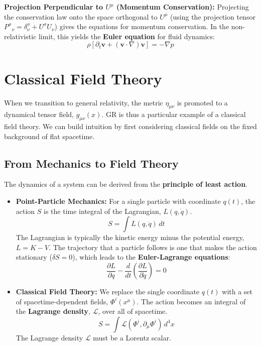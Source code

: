 \documentclass[11pt, a4paper]{report}
\begin{document}
\textbf{Projection Perpendicular to $U^\mu$ (Momentum Conservation):} Projecting the conservation law onto the space orthogonal to $U^\mu$ (using the projection tensor ${P^\sigma}_\nu = \delta^\sigma_\nu + U^\sigma U_\nu$) gives the equations for momentum conservation. In the non-relativistic limit, this yields the \textbf{Euler equation} for fluid dynamics:
\begin{equation}
    \rho[\partial_t \mathbf{v} + (\mathbf{v}\cdot\nabla)\mathbf{v}] = -\nabla p
\end{equation}
\section{Classical Field Theory}

When we transition to general relativity, the metric $\eta_{\mu\nu}$ is promoted to a dynamical tensor field, $g_{\mu\nu}(x)$. GR is thus a particular example of a classical field theory. We can build intuition by first considering classical fields on the fixed background of flat spacetime.

\subsection*{From Mechanics to Field Theory}

The dynamics of a system can be derived from the \textbf{principle of least action}.
\begin{itemize}
    \item \textbf{Point-Particle Mechanics:} For a single particle with coordinate $q(t)$, the action $S$ is the time integral of the Lagrangian, $L(q, \dot{q})$.
    \begin{equation}
        S = \int L(q, \dot{q}) \, dt
    \end{equation}
    The Lagrangian is typically the kinetic energy minus the potential energy, $L=K-V$. The trajectory that a particle follows is one that makes the action stationary ($\delta S = 0$), which leads to the \textbf{Euler-Lagrange equations}:
    \begin{equation}
        \frac{\partial L}{\partial q} - \frac{d}{dt}\left(\frac{\partial L}{\partial \dot{q}}\right) = 0
    \end{equation}

    \item \textbf{Classical Field Theory:} We replace the single coordinate $q(t)$ with a set of spacetime-dependent fields, $\Phi^i(x^\mu)$. The action becomes an integral of the \textbf{Lagrange density}, $\mathcal{L}$, over all of spacetime.
    \begin{equation}
        S = \int \mathcal{L}(\Phi^i, \partial_\mu\Phi^i) \, d^4x
    \end{equation}
    The Lagrange density $\mathcal{L}$ must be a Lorentz scalar.
\end{itemize}
\end{document}
